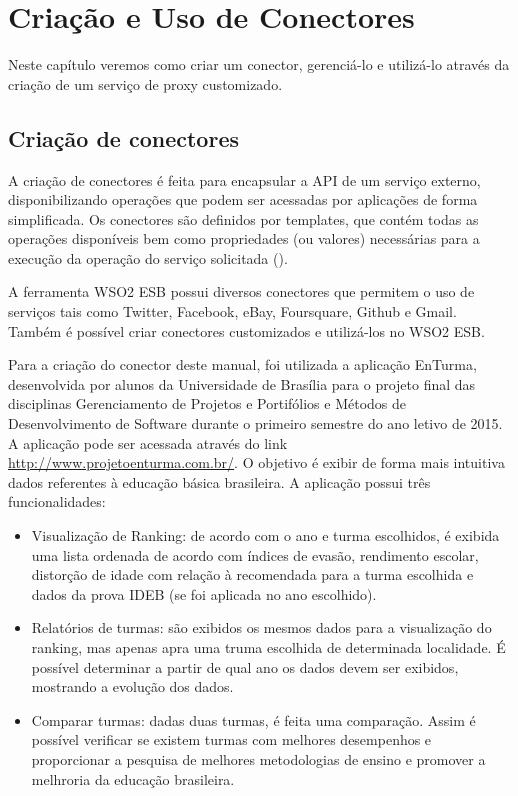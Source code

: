 \chapter[Criação e Uso de Conectores]{Criação e Uso de Conectores}

Neste capítulo veremos como criar um conector, gerenciá-lo e utilizá-lo através da criação de um serviço de proxy customizado.

\section{Criação de conectores}

A criação de conectores é feita para encapsular a API de um serviço externo, disponibilizando operações que podem ser acessadas por aplicações de forma simplificada. Os conectores são definidos por templates, que contém todas as operações disponíveis bem como propriedades (ou valores) necessárias para a execução da operação do serviço solicitada (\cite{working_with_connecntors}).

A ferramenta WSO2 ESB possui diversos conectores que permitem o uso de serviços tais como Twitter, Facebook, eBay, Foursquare, Github e Gmail. Também  é possível criar conectores customizados e utilizá-los no WSO2 ESB.

Para a criação do conector deste manual, foi utilizada a aplicação EnTurma, desenvolvida por alunos da Universidade de Brasília para o projeto final das disciplinas Gerenciamento de Projetos e Portifólios e Métodos de Desenvolvimento de Software durante o primeiro semestre do ano letivo de 2015. A aplicação pode ser acessada através do link \url{http://www.projetoenturma.com.br/}. O objetivo é exibir de forma mais intuitiva dados referentes à educação básica brasileira. A aplicação possui três funcionalidades:
\begin{itemize}
\item Visualização de Ranking: de acordo com o ano e turma escolhidos, é exibida uma lista ordenada de acordo com índices de evasão, rendimento escolar, distorção de idade com relação à recomendada para a turma escolhida e dados da prova IDEB (se foi aplicada no ano escolhido).
\item Relatórios de turmas: são exibidos os mesmos dados para a visualização do ranking, mas apenas apra uma truma escolhida de determinada localidade. É possível determinar a partir de qual ano os dados devem ser exibidos, mostrando a evolução dos dados.
\item Comparar turmas: dadas duas turmas, é feita uma comparação. Assim é possível verificar se existem turmas com melhores desempenhos e proporcionar a pesquisa de melhores metodologias de ensino e promover a melhroria da educação brasileira.
\end{itemize}

